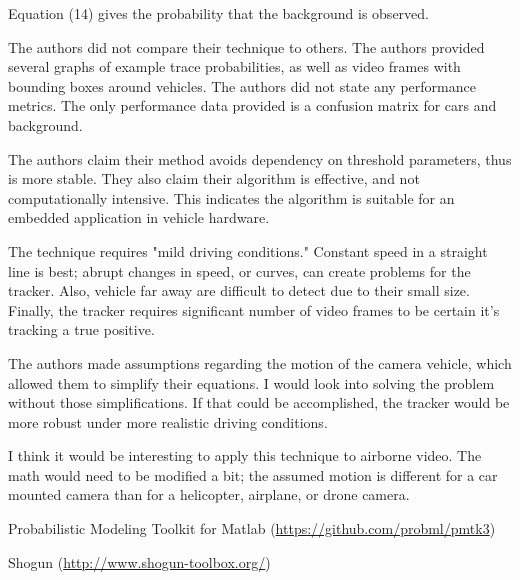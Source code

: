\documentclass[11pt]{article}
\begin{document}
\begin{description}[leftmargin=0in]
        Equation (14) gives the probability that the background is observed.

    \item [Experiments] The authors did not compare their technique to others. The authors provided
        several graphs of example trace probabilities, as well as video frames with bounding boxes
        around vehicles. The authors did not state any performance metrics. The only performance
        data provided is a confusion matrix for cars and background.

    \item [Contributions] The authors claim their method avoids dependency on threshold parameters,
        thus is more stable. They also claim their algorithm is effective, and not computationally
        intensive. This indicates the algorithm is suitable for an embedded application in vehicle
        hardware.

    \item [Shortcomings] The technique requires "mild driving conditions." Constant speed in a
        straight line is best; abrupt changes in speed, or curves, can create problems for the
        tracker. Also, vehicle far away are difficult to detect due to their small size. Finally,
        the tracker requires significant number of video frames to be certain it's tracking a true
        positive.

    \item [Self Evaluation]

    \item [Improvements] The authors made assumptions regarding the motion of the camera vehicle,
        which allowed them to simplify their equations. I would look into solving the problem
        without those simplifications. If that could be accomplished, the tracker would be more
        robust under more realistic driving conditions.

    \item [Applications] I think it would be interesting to apply this technique to airborne video.
        The math would need to be modified a bit; the assumed motion is different for a car mounted
        camera than for a helicopter, airplane, or drone camera.

    \item [Packages]

        Probabilistic Modeling Toolkit for Matlab (\url{https://github.com/probml/pmtk3})

        Shogun (\url{http://www.shogun-toolbox.org/})

\end{description}

 
\end{document}
